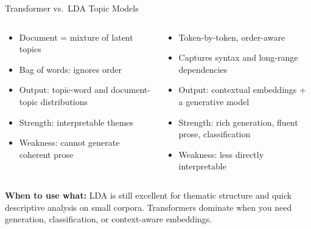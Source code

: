 \documentclass[10pt,english,aspectratio=169]{beamer}
\begin{document}
\begin{frame}{Transformer vs.\ LDA Topic Models}
\begin{columns}[T]
\begin{tcolorbox}[colback=blue!5, colframe=blue!50!black, title=\textbf{LDA / topic models}]
\begin{itemize}
\item Document = mixture of latent topics
\item Bag of words: ignores order
\item Output: topic-word and document-topic distributions
\item Strength: interpretable themes
\item Weakness: cannot generate coherent prose
\end{itemize}
\end{tcolorbox}

\begin{tcolorbox}[colback=green!5, colframe=green!40!black, title=\textbf{Transformers}]
\begin{itemize}
\item Token-by-token, order-aware
\item Captures syntax and long-range dependencies
\item Output: contextual embeddings + a generative model
\item Strength: rich generation, fluent prose, classification
\item Weakness: less directly interpretable
\end{itemize}
\end{tcolorbox}
\end{columns}

\medskip
\textbf{When to use what:} LDA is still excellent for thematic structure and quick descriptive analysis on small corpora. Transformers dominate when you need generation, classification, or context-aware embeddings.
\end{frame}
\end{document}
